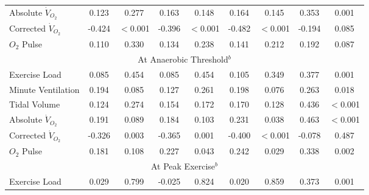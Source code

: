 \begin{table}[p]
\begin{tabular}{|l| c c | c c | c c | c c|}
		Absolute $\dot{V}_{O_2}$  & 0.123  & 0.277                     & 0.163  & 0.148                     & 0.164  & 0.145                     & 0.353  & 0.001                       \\
		Corrected $\dot{V}_{O_2}$ & -0.424 & $<$0.001                  & -0.396 & $<$0.001                  & -0.482 & $<$0.001                  & -0.194 & 0.085                       \\
		$O_2$ Pulse               & 0.110  & 0.330                     & 0.134  & 0.238                     & 0.141  & 0.212                     & 0.192  & 0.087                       \\ \hline
		\multicolumn{9}{|c|}{At Anaerobic Threshold$^b$}                                                                                                                                \\ \hline
		Exercise Load             & 0.085  & 0.454                     & 0.085  & 0.454                     & 0.105  & 0.349                     & 0.377  & 0.001                       \\
		Minute Ventilation        & 0.194  & 0.085                     & 0.127  & 0.261                     & 0.198  & 0.076                     & 0.263  & 0.018                       \\
		Tidal Volume              & 0.124  & 0.274                     & 0.154  & 0.172                     & 0.170  & 0.128                     & 0.436  & $<$0.001                    \\
		Absolute $\dot{V}_{O_2}$  & 0.191  & 0.089                     & 0.184  & 0.103                     & 0.231  & 0.038                     & 0.463  & $<$0.001                    \\
		Corrected $\dot{V}_{O_2}$ & -0.326 & 0.003                     & -0.365 & 0.001                     & -0.400 & $<$0.001                  & -0.078 & 0.487                       \\
		$O_2$ Pulse               & 0.181  & 0.108                     & 0.227  & 0.043                     & 0.242  & 0.029                     & 0.338  & 0.002                       \\ \hline
		\multicolumn{9}{|c|}{At Peak Exercise$^b$}                                                                                                                                      \\ \hline
		Exercise Load             & 0.029  & 0.799                     & -0.025 & 0.824                     & 0.020  & 0.859                     & 0.373  & 0.001                       \\

\end{tabular}
\end{table}
